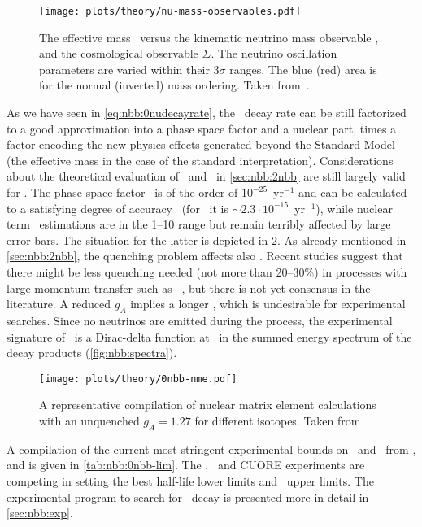 \begin{figure}
  \centering
  \texttt{[image: plots/theory/nu-mass-observables.pdf]}
  \caption{%
    The effective mass \mbb\ versus the kinematic neutrino mass observable
    \mb, and the cosmological observable $\Sigma$. The neutrino
    oscillation parameters are varied within their $3\sigma$ ranges. The blue
    (red) area is for the normal (inverted) mass ordering. Taken
    from~\cite{Dolinski2019}.
  }\label{fig:nbb:mass-obs}
\end{figure}

As we have seen in \cref{eq:nbb:0nudecayrate}, the \onbb\ decay rate can be still
factorized to a good approximation into a phase space factor and a nuclear part, times a
factor encoding the new physics effects generated beyond the Standard Model (the effective
mass in the case of the standard interpretation). Considerations about the theoretical
evaluation of \psft\ and \nmet\ in \cref{sec:nbb:2nbb} are still largely valid for \onbb.
The phase space factor \psfz\ is of the order of $10^{-25}$~yr$^{-1}$ and can be
calculated to a satisfying degree of accuracy~\cite{Kotila2012, Stoica2013} (for \gesix\
it is ${\sim}2.3 \cdot 10^{-15}$~yr$^{-1}$), while nuclear term \nmez\ estimations are in
the 1--10 range but remain terribly affected by large error bars. The situation for the
latter is depicted in \cref{fig:nbb:nme}. As already mentioned in \cref{sec:nbb:2nbb}, the
quenching problem affects also \onbb. Recent studies suggest that there might be less
quenching needed (not more than 20--30\%) in processes with large momentum transfer such
as \onbb~\cite{?}, but there is not yet consensus in the literature. A reduced $g_A$
implies a longer \thalfzero, which is undesirable for experimental searches.  Since no
neutrinos are emitted during the process, the experimental signature of \onbb\ is a
Dirac-delta function at \qbb\ in the summed energy spectrum of the decay products
(\cref{fig:nbb:spectra}).

\begin{figure}
  \centering
  \texttt{[image: plots/theory/0nbb-nme.pdf]}
  \caption{%
    A representative compilation of nuclear matrix element calculations with an unquenched
    $g_A=1.27$ for different isotopes. Taken from~\cite{Yao2020}.
  }\label{fig:nbb:nme}
\end{figure}

A compilation of the current most stringent experimental bounds on \thalfzero\ and \mbb\
from \gesix,  and  is given in \cref{tab:nbb:0nbb-lim}. The
\gerda, \kamlandzen\ and CUORE experiments are competing in setting the best half-life
lower limits and \mbb\ upper limits. The experimental program to search for \onbb\ decay
is presented more in detail in \cref{sec:nbb:exp}.

